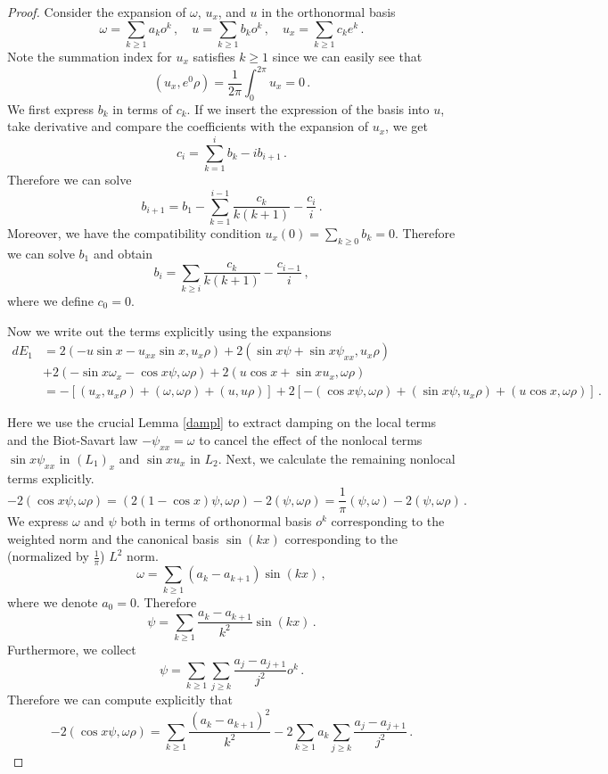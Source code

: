 \documentclass[10pt,a4paper]{amsart}
\begin{document}
\begin{proof}
Consider the expansion of $\omega$, $u_x$, and $u$ in the orthonormal basis
$$\omega=\sum_{k\geq 1} a_k o^k\,, \quad u=\sum_{k\geq 1} b_k o^k\,, \quad u_x=\sum_{k\geq1} c_k e^k\,.$$
Note the summation index for $u_x$ satisfies $k \geq 1$ since we can easily see that $$ (u_x,e^0\rho)=\frac{1}{2\pi}\int_0^{2\pi} u_x=0\,.$$We first express $b_k$ in terms of $c_k$. If we insert the expression of the basis into $u$, take derivative and compare the coefficients with the expansion of $u_x$, we get $$c_i=\sum_{k=1}^i b_k-ib_{i+1}\,.$$
Therefore we can solve $$b_{i+1}=b_1-\sum_{k=1}^{i-1}\frac{c_k}{k(k+1)}-\frac{c_{i}}{i}\,.$$
Moreover, we have the compatibility condition $u_x(0)=\sum_{k \geq 0} b_k=0$. Therefore we can solve $b_1$ and obtain 
\begin{equation}\label{bc}
    b_{i}=\sum_{k\geq i}\frac{c_k}{k(k+1)}-\frac{c_{i-1}}{i}\,,
\end{equation}
where we define $c_0=0$.

Now we write out the terms explicitly using the expansions
\begin{equation*}
\begin{aligned}
dE_1&=2(-u\sin x-u_{xx}\sin x,u_x\rho)+2(\sin x\psi+\sin x\psi_{xx},u_x\rho)\\&+2(- \sin x \omega_x- \cos x\psi,\omega \rho) +2 (u \cos{x}+\sin x u_x,\omega \rho)\\&=-[(u_x,u_x\rho)+(\omega,\omega\rho)+(u,u\rho)]+2[-( \cos x\psi,\omega \rho)+(\sin x\psi,u_x\rho)+ (u \cos{x},\omega \rho)]\,.    
\end{aligned}    
\end{equation*}

Here we use the crucial Lemma \ref{dampl} to extract damping on the local terms and the Biot-Savart law $-\psi_{xx}=\omega$ to cancel the effect of the nonlocal terms {$\sin x\psi_{xx}$ in $(L_1)_x$ and $\sin xu_{x}$ in $L_2$}. Next, we calculate the remaining nonlocal terms explicitly.
$$-2( \cos x\psi,\omega \rho)=(2(1-\cos x)\psi,\omega \rho)-2(\psi,\omega \rho)=\frac{1}{\pi}(\psi,\omega)-2(\psi,\omega \rho)\,.$$
We express $\omega$ and $\psi$ both in terms of orthonormal basis $o^k$ corresponding to the weighted norm and the canonical basis $\sin(kx)$ corresponding to the (normalized by $\frac{1}{\pi}$) $L^2$ norm.
$$\omega=\sum_{k \geq 1} (a_k-a_{k+1}) \sin(kx)\,,$$
where we denote $a_0=0$. Therefore 
$$\psi=\sum_{k \geq 1} \frac{a_k-a_{k+1}}{k^2} \sin(kx)\,.$$
Furthermore, we collect
$$\psi=\sum_{k\geq 1} \sum_{j\geq k}\frac{a_j-a_{j+1}}{j^2} o^k\,.$$
Therefore we can compute explicitly that 
$$-2( \cos x\psi,\omega \rho)=\sum_{k \geq 1} \frac{(a_k-a_{k+1})^2}{k^2}-2\sum_{k\geq 1} a_k\sum_{j\geq k}\frac{a_j-a_{j+1}}{j^2}\,.$$


\end{proof}
\end{document}
